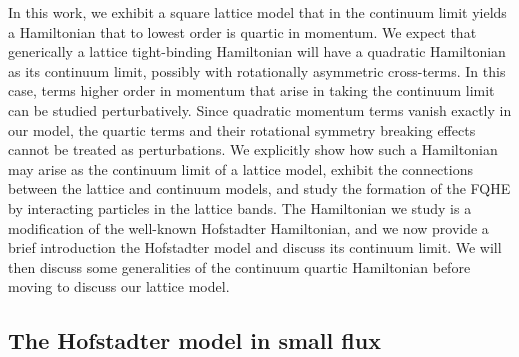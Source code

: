 \documentclass[aps,twocolumn,letterpaper,twoside,nobalancelastpage,groupedaddress,amsmath,amssymb,floatfix,citeautoscript]{revtex4-1}
\begin{document}
In this work, we exhibit a square lattice model that in the continuum limit yields a Hamiltonian that to lowest order is quartic in momentum. We expect that generically a lattice tight-binding Hamiltonian will have a quadratic Hamiltonian as its continuum limit, possibly with rotationally asymmetric cross-terms. In this case, terms higher order in momentum that arise in taking the continuum limit can be studied perturbatively. Since quadratic momentum terms vanish exactly in our model, the quartic terms and their rotational symmetry breaking effects cannot be treated as perturbations. We explicitly show how such a Hamiltonian may arise as the continuum limit of a lattice model, exhibit the connections between the lattice and continuum models, and study the formation of the FQHE by interacting particles in the lattice bands. The Hamiltonian we study is a modification of the well-known Hofstadter Hamiltonian, and we now provide a brief introduction the Hofstadter model and discuss its continuum limit. We will then discuss some generalities of the continuum quartic Hamiltonian before moving to discuss our lattice model.

\subsection{The Hofstadter model in small flux}
\end{document}
